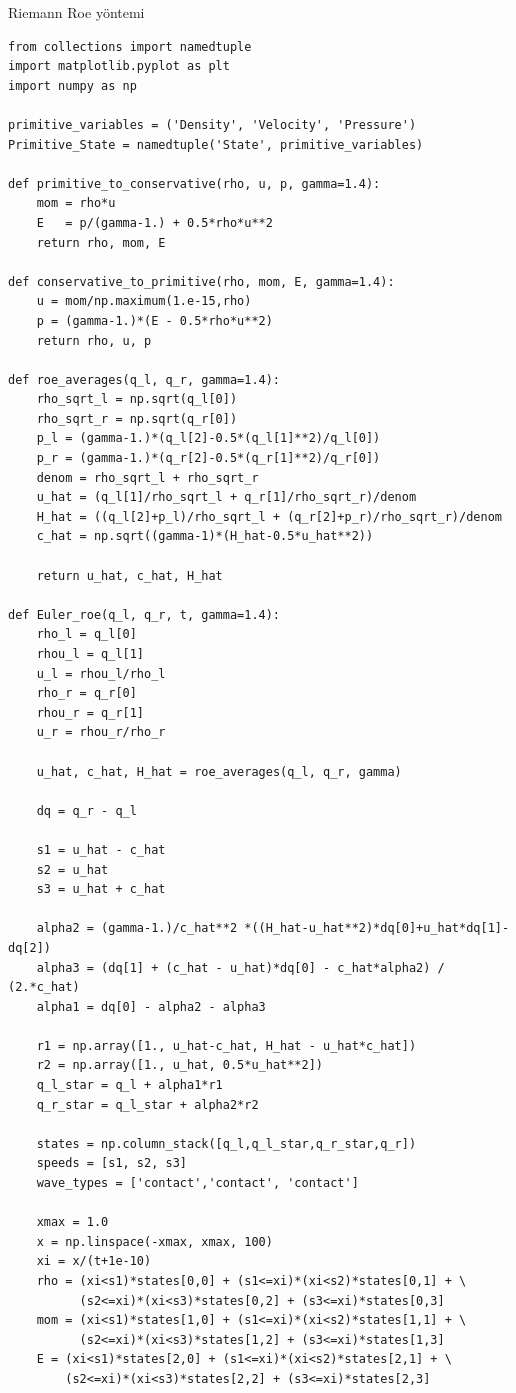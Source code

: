 \documentclass[12pt,fleqn]{article}\usepackage{../../common}
\begin{document}
Riemann Roe yöntemi 

\begin{verbatim}
from collections import namedtuple
import matplotlib.pyplot as plt
import numpy as np

primitive_variables = ('Density', 'Velocity', 'Pressure')
Primitive_State = namedtuple('State', primitive_variables)

def primitive_to_conservative(rho, u, p, gamma=1.4):
    mom = rho*u
    E   = p/(gamma-1.) + 0.5*rho*u**2
    return rho, mom, E

def conservative_to_primitive(rho, mom, E, gamma=1.4):
    u = mom/np.maximum(1.e-15,rho)
    p = (gamma-1.)*(E - 0.5*rho*u**2)
    return rho, u, p

def roe_averages(q_l, q_r, gamma=1.4):
    rho_sqrt_l = np.sqrt(q_l[0])
    rho_sqrt_r = np.sqrt(q_r[0])
    p_l = (gamma-1.)*(q_l[2]-0.5*(q_l[1]**2)/q_l[0])
    p_r = (gamma-1.)*(q_r[2]-0.5*(q_r[1]**2)/q_r[0])
    denom = rho_sqrt_l + rho_sqrt_r
    u_hat = (q_l[1]/rho_sqrt_l + q_r[1]/rho_sqrt_r)/denom
    H_hat = ((q_l[2]+p_l)/rho_sqrt_l + (q_r[2]+p_r)/rho_sqrt_r)/denom
    c_hat = np.sqrt((gamma-1)*(H_hat-0.5*u_hat**2))
    
    return u_hat, c_hat, H_hat
        
def Euler_roe(q_l, q_r, t, gamma=1.4):
    rho_l = q_l[0]
    rhou_l = q_l[1]
    u_l = rhou_l/rho_l
    rho_r = q_r[0]
    rhou_r = q_r[1]
    u_r = rhou_r/rho_r
    
    u_hat, c_hat, H_hat = roe_averages(q_l, q_r, gamma)

    dq = q_r - q_l
    
    s1 = u_hat - c_hat
    s2 = u_hat
    s3 = u_hat + c_hat
    
    alpha2 = (gamma-1.)/c_hat**2 *((H_hat-u_hat**2)*dq[0]+u_hat*dq[1]-dq[2])
    alpha3 = (dq[1] + (c_hat - u_hat)*dq[0] - c_hat*alpha2) / (2.*c_hat)
    alpha1 = dq[0] - alpha2 - alpha3
    
    r1 = np.array([1., u_hat-c_hat, H_hat - u_hat*c_hat])
    r2 = np.array([1., u_hat, 0.5*u_hat**2])
    q_l_star = q_l + alpha1*r1
    q_r_star = q_l_star + alpha2*r2
    
    states = np.column_stack([q_l,q_l_star,q_r_star,q_r])
    speeds = [s1, s2, s3]
    wave_types = ['contact','contact', 'contact']
    
    xmax = 1.0
    x = np.linspace(-xmax, xmax, 100)
    xi = x/(t+1e-10)
    rho = (xi<s1)*states[0,0] + (s1<=xi)*(xi<s2)*states[0,1] + \
          (s2<=xi)*(xi<s3)*states[0,2] + (s3<=xi)*states[0,3]
    mom = (xi<s1)*states[1,0] + (s1<=xi)*(xi<s2)*states[1,1] + \
          (s2<=xi)*(xi<s3)*states[1,2] + (s3<=xi)*states[1,3]
    E = (xi<s1)*states[2,0] + (s1<=xi)*(xi<s2)*states[2,1] + \
        (s2<=xi)*(xi<s3)*states[2,2] + (s3<=xi)*states[2,3]
    

\end{verbatim}
\end{document}
